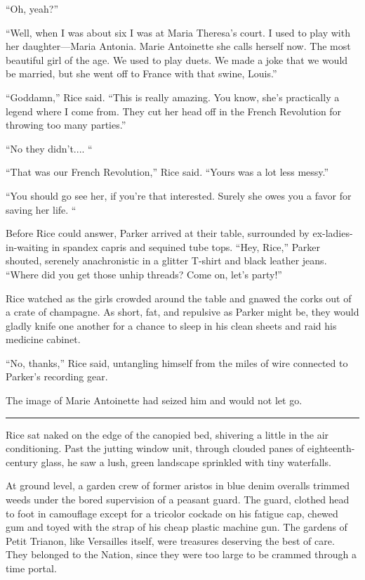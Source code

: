 ``Oh, yeah?''

``Well, when I was about six I was at Maria Theresa's court. I used to play with her daughter—Maria Antonia. Marie Antoinette she calls herself now. The most beautiful girl of the age. We used to play duets. We made a joke that we would be married, but she went off to France with that swine, Louis.''

``Goddamn,'' Rice said. ``This is really amazing. You know, she's practically a legend where I come from. They cut her head off in the French Revolution for throwing too many parties.''

``No they didn't.... ``

``That was our French Revolution,'' Rice said. ``Yours was a lot less messy.''

``You should go see her, if you're that interested. Surely she owes you a favor for saving her life. ``

Before Rice could answer, Parker arrived at their table, surrounded by ex-ladies-in-waiting in spandex capris and sequined tube tops. ``Hey, Rice,'' Parker shouted, serenely anachronistic in a glitter T-shirt and black leather jeans. ``Where did you get those unhip threads? Come on, let's party!''

Rice watched as the girls crowded around the table and gnawed the corks out of a crate of champagne. As short, fat, and repulsive as Parker might be, they would gladly knife one another for a chance to sleep in his clean sheets and raid his medicine cabinet.

``No, thanks,'' Rice said, untangling himself from the miles of wire connected to Parker's recording gear.

The image of Marie Antoinette had seized him and would not let go.

\fancybreak{* * *}

Rice sat naked on the edge of the canopied bed, shivering a little in the air conditioning. Past the jutting window unit, through clouded panes of eighteenth-century glass, he saw a lush, green landscape sprinkled with tiny waterfalls.

At ground level, a garden crew of former aristos in blue denim overalls trimmed weeds under the bored supervision of a peasant guard. The guard, clothed head to foot in camouflage except for a tricolor cockade on his fatigue cap, chewed gum and toyed with the strap of his cheap plastic machine gun. The gardens of Petit Trianon, like Versailles itself, were treasures deserving the best of care. They belonged to the Nation, since they were too large to be crammed through a time portal.


